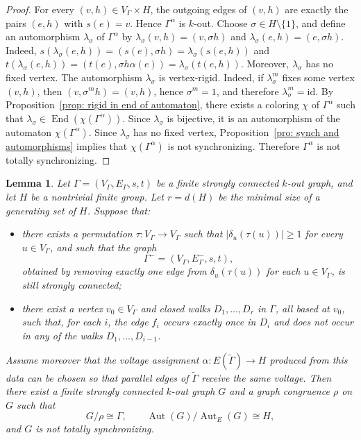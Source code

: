 \documentclass[a4paper,10pt]{amsart}
\theoremstyle{plain}
\newtheorem{lemma}[theorem]{Lemma}
\theoremstyle{definition}
\DeclareMathOperator{\Aut}{Aut}
\DeclareMathOperator{\End}{End}
\newcommand{\id}{\mathrm{id}}
\begin{document}
\begin{proof}
For every $(v,h)\in V_\Gamma\times H$, the outgoing edges of $(v,h)$ are exactly the pairs
$(e,h)$ with $s(e)=v$. Hence $\Gamma^\alpha$ is $k$-out. Choose $\sigma\in H\setminus\{1\}$, and define an automorphism $\lambda_\sigma$ of $\Gamma^\alpha$ by
$\lambda_\sigma(v,h)=(v,\sigma h)$ and $\lambda_\sigma(e,h)=(e,\sigma h)$.
Indeed,
$s(\lambda_\sigma(e,h))=(s(e),\sigma h)=\lambda_\sigma(s(e,h))$ and
$t(\lambda_\sigma(e,h))=(t(e),\sigma h\alpha(e))=\lambda_\sigma(t(e,h))$.
Moreover, $\lambda_\sigma$ has no fixed vertex. The automorphism $\lambda_\sigma$ is vertex-rigid. Indeed, if $\lambda_\sigma^m$ fixes some vertex
$(v,h)$, then $(v,\sigma^m h)=(v,h)$, hence $\sigma^m=1$, and therefore $\lambda_\sigma^m=\id$. By Proposition~\ref{prop: rigid in end of automaton}, there exists a coloring $\chi$ of
$\Gamma^\alpha$ such that $\lambda_\sigma\in\End(\chi(\Gamma^\alpha))$. Since $\lambda_\sigma$ is
bijective, it is an automorphism of the automaton $\chi(\Gamma^\alpha)$.
Since $\lambda_\sigma$ has no fixed vertex, Proposition~\ref{pro: synch and automorphisms} implies
that $\chi(\Gamma^\alpha)$ is not synchronizing. Therefore $\Gamma^\alpha$ is not totally
synchronizing.
\end{proof}


\begin{lemma}\label{lem:frucht_extension_mod_edge}
Let $\Gamma=(V_\Gamma,E_\Gamma,s,t)$ be a finite strongly connected $k$-out graph, and let $H$ be a nontrivial finite group. Let $r=d(H)$ be the minimal size of a generating set of $H$. Suppose that:
\begin{itemize}
    \item there exists a permutation $\tau:V_\Gamma\to V_\Gamma$ such that $|\delta_u(\tau(u))|\ge 1$ for every $u\in V_\Gamma$, and such that the graph
    \[
    \Gamma^-=(V_\Gamma,E_\Gamma^-,s,t),
    \]
    obtained by removing exactly one edge from $\delta_u(\tau(u))$ for each $u\in V_\Gamma$, is still strongly connected;

    \item there exist a vertex $v_0\in V_\Gamma$ and closed walks $D_1,\dots,D_r$ in $\Gamma$, all based at $v_0$, such that, for each $i$, the edge $f_i$ occurs exactly once in $D_i$ and does not occur in any of the walks $D_1,\dots,D_{i-1}$.
\end{itemize}
Assume moreover that the voltage assignment $\alpha:E(\widetilde\Gamma)\to H$ produced from this data can be chosen so that parallel edges of $\widetilde\Gamma$ receive the same voltage. Then there exist a finite strongly connected $k$-out graph $G$ and a graph congruence $\rho$ on $G$ such that
\[
G/\rho\cong \Gamma,\qquad \Aut(G)/\Aut_E(G)\cong H,
\]
and $G$ is not totally synchronizing.
\end{lemma}
\end{document}

